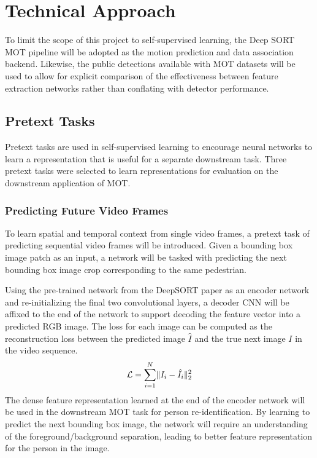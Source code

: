 \documentclass[10pt,twocolumn,letterpaper]{article}
\begin{document}
\section{Technical Approach}
To limit the scope of this project to self-supervised learning, the Deep SORT MOT pipeline \cite{Wojke2018} will be adopted as the motion prediction and data association backend. Likewise, the public detections available with MOT datasets will be used to allow for explicit comparison of the effectiveness between feature extraction networks rather than conflating with detector performance. 
\subsection{Pretext Tasks}
Pretext tasks are used in self-supervised learning to encourage neural networks to learn a representation that is useful for a separate downstream task. Three pretext tasks were selected to learn representations for evaluation on the downstream application of MOT.
\subsubsection{Predicting Future Video Frames}

To learn spatial and temporal context from single video frames, a pretext task of predicting sequential video frames will be introduced. Given a bounding box image patch as an input, a network will be tasked with predicting the next bounding box image crop corresponding to the same pedestrian. 

Using the pre-trained network from the DeepSORT paper as an encoder network and re-initializing the final two convolutional layers, a decoder CNN will be affixed to the end of the network to support decoding the feature vector into a predicted RGB image.
The loss for each image can be computed as the reconstruction loss between the predicted image $\hat{I}$ and the true next image $I$ in the video sequence.
\begin{equation}
    \mathcal{L} = \sum_{i=1}^N \lVert I_i-\hat{I}_i \rVert_2^2
\end{equation}
The dense feature representation learned at the end of the encoder network will be used in the downstream MOT task for person re-identification. By learning to predict the next bounding box image, the network will require an understanding of the foreground/background separation, leading to better feature representation for the person in the image.
\end{document}
